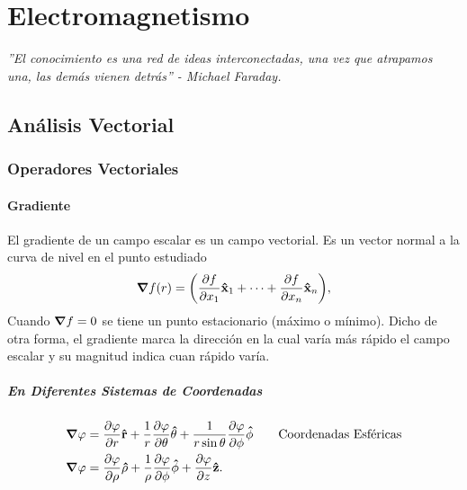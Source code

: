 \part{Electromagnetismo}

\vspace*{\fill}

\begin{center}
	\textit{''El conocimiento es una red de ideas interconectadas, una vez que atrapamos una, las demás vienen detrás'' - Michael Faraday.}
\end{center}

\vspace*{\fill}

\chapter{Análisis Vectorial}
\section{Operadores Vectoriales}
\subsection{Gradiente}
El gradiente de un campo escalar es un campo vectorial. Es un vector normal a la curva de nivel en el punto estudiado
\begin{equation}
	\grad{f(r)} = \qty(\pdv{f}{x_1} \vu{x}_1 + \cdots + \pdv{f}{x_n} \vu{x}_n),
\end{equation}
Cuando $\grad{f} = 0$ se tiene un punto estacionario (máximo o mínimo). Dicho de otra forma, el gradiente marca la dirección en la cual varía más rápido el campo escalar y su magnitud indica cuan rápido varía. \\
\subsubsection{En Diferentes Sistemas de Coordenadas}
\begin{align*}
	\grad{\varphi} &= \pdv{\varphi}{r} \vu{r} + \frac{1}{r} \pdv{\varphi}{\theta} \vu{\theta} + \frac{1}{r\sin{\theta}} \pdv{\varphi}{\phi} \vu{\phi} \qquad \text{Coordenadas Esféricas} \\
	\grad{\varphi} &= \pdv{\varphi}{\rho} \vu{\rho} + \frac{1}{\rho} \pdv{\varphi}{\phi} \vu{\phi} + \pdv{\varphi}{z} \vu{z}.
\end{align*}
 


